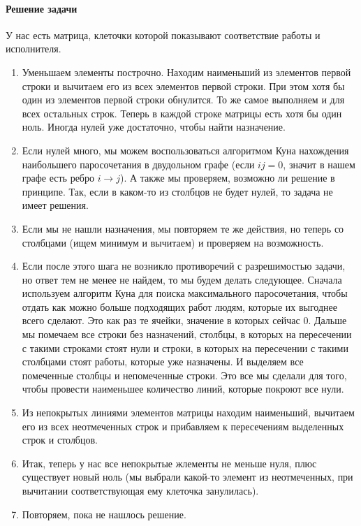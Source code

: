 \paragraph{Решение задачи}
У нас есть матрица, клеточки которой показывают соответствие работы и исполнителя.
\begin{enumerate}
	\item Уменьшаем элементы построчно. Находим наименьший из элементов первой строки и вычитаем его из всех элементов первой строки. При этом хотя бы один из элементов первой строки обнулится. 
	То же самое выполняем и для всех остальных строк. Теперь в каждой строке матрицы есть хотя бы один ноль. Иногда нулей уже достаточно, чтобы найти назначение.
    \item Если нулей много, мы можем воспользоваться алгоритмом Куна нахождения наибольшего паросочетания в двудольном графе (если $ij = 0$, значит в нашем графе есть ребро $i \to j$). А также мы проверяем,
    возможно ли решение в принципе. Так, если в каком-то из столбцов не будет нулей, то задача не имеет решения.
    \item Если мы не нашли назначения, мы повторяем те же действия, но теперь со столбцами (ищем минимум и вычитаем) и проверяем на возможность.
    \item Если после этого шага не возникло противоречий с разрешимостью задачи, но ответ тем не менее не найдем, то мы будем делать следующее. Сначала используем алгоритм Куна для поиска максимального
    паросочетания, чтобы отдать как можно больше подходящих работ людям, которые их выгоднее всего сделают. Это как раз те ячейки, значение в которых сейчас 0. Дальше мы помечаем все строки без назначений,
    столбцы, в которых на пересечении с такими строками стоят нули и строки, в которых на пересечении с такими столбцами стоят работы, которые уже назначены. И выделяем все помеченные столбцы и непомеченные 
    строки. Это все мы сделали для того, чтобы провести наименьшее количество линий, которые покроют все нули.
    \item Из непокрытых линиями элементов матрицы находим наименьший, вычитаем его из всех неотмеченных строк и прибавляем к пересечениям выделенных строк и столбцов.
    \item Итак, теперь у нас все непокрытые жлементы не меньше нуля, плюс существует новый ноль (мы выбрали какой-то элемент из неотмеченных, при вычитании соответствующая ему клеточка занулилась).
    \item Повторяем, пока не нашлось решение.
\end{enumerate}
 

 
